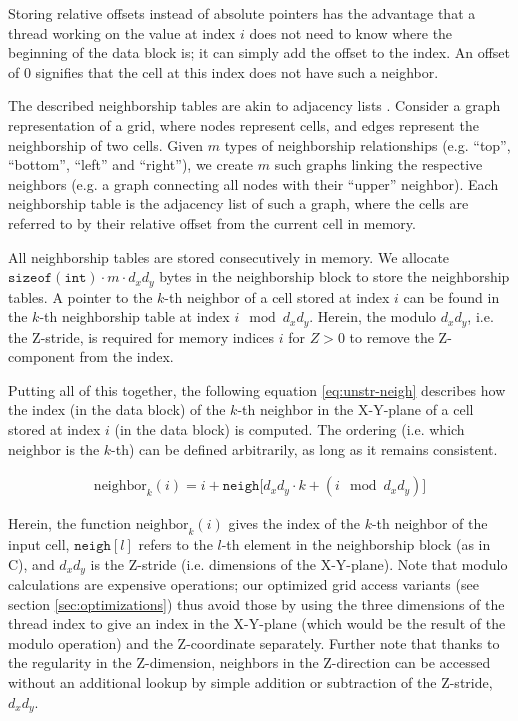 Storing relative offsets instead of absolute pointers has the advantage that a thread working on the value at index $i$ does not need to know where the beginning of the data block is; it can simply add the offset to the index. An offset of $0$ signifies that the cell at this index does not have such a neighbor.

The described neighborship tables are akin to adjacency lists \cite[Chapter 12]{DSA}. Consider a graph representation of a grid, where nodes represent cells, and edges represent the neighborship of two cells. Given $m$ types of neighborship relationships (e.g. ``top'', ``bottom'', ``left'' and ``right''), we create $m$ such graphs linking the respective neighbors (e.g. a graph connecting all nodes with their ``upper'' neighbor). Each neighborship table is the adjacency list of such a graph, where the cells are referred to by their relative offset from the current cell in memory. 

All neighborship tables are stored consecutively in memory. We allocate $\mathtt{sizeof(int)}\cdot m \cdot d_x d_y$ bytes in the neighborship block to store the neighborship tables. A pointer to the $k$-th neighbor of a cell stored at index $i$ can be found in the $k$-th neighborship table at index $i \mod d_xd_y$. Herein, the modulo $d_xd_y$, i.e. the Z-stride, is required for memory indices $i$ for $Z>0$ to remove the Z-component from the index.

Putting all of this together, the following equation \ref{eq:unstr-neigh} describes how the index (in the data block) of the $k$-th neighbor in the X-Y-plane of a cell stored at index $i$ (in the data block) is computed. The ordering (i.e. which neighbor is the $k$-th) can be defined arbitrarily, as long as it remains consistent.

\begin{gather}
    \text{neighbor}_k(i) = i + \mathtt{neigh[}d_xd_y\cdot k + (i \mod d_xd_y)\mathtt{]} \label{eq:unstr-neigh}
\end{gather}

Herein, the function $\text{neighbor}_k(i)$ gives the index of the $k$-th neighbor of the input cell, $\mathtt{neigh}[l]$ refers to the $l$-th element in the neighborship block (as in C), and $d_xd_y$ is the Z-stride (i.e. dimensions of the X-Y-plane). Note that modulo calculations are expensive operations; our optimized grid access variants (see section \ref{sec:optimizations}) thus avoid those by using the three dimensions of the thread index to give an index in the X-Y-plane (which would be the result of the modulo operation) and the Z-coordinate separately. Further note that thanks to the regularity in the Z-dimension, neighbors in the Z-direction can be accessed without an additional lookup by simple addition or subtraction of the Z-stride, $d_xd_y$.

